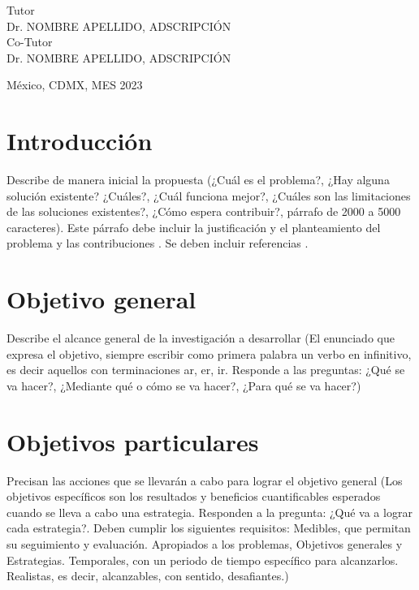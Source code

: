 \documentclass[letterpaper,12pt,oneside]{article}
\begin{document}
\begin{titlepage}
\begin{center}
\begin{center}
				\bigskip
				
				Tutor\\
				Dr. NOMBRE APELLIDO, ADSCRIPCIÓN\\
				
				Co-Tutor \\ %
                Dr. NOMBRE APELLIDO, ADSCRIPCIÓN\\
			\end{center}
			
			\vfill
			
			\begin{center}
				{México, CDMX, MES 2023}\\
			\end{center}
			\cleardoublepage
		\end{center}
	\end{titlepage}
 
\clearpage

\tableofcontents
\clearpage

\section{Introducción} 
Describe de manera inicial la propuesta (¿Cuál es el problema?, ¿Hay alguna solución existente? ¿Cuáles?, ¿Cuál funciona mejor?, ¿Cuáles son las limitaciones de las soluciones existentes?, ¿Cómo espera contribuir?, párrafo de 2000 a 5000 caracteres). Este párrafo debe incluir la justificación y el planteamiento del problema y las contribuciones \cite{phil99}. Se deben incluir referencias \cite{smit54, jame76}.

\section{Objetivo general}
Describe el alcance general de la investigación a desarrollar (El enunciado que expresa el objetivo, siempre escribir como primera palabra un verbo en infinitivo, es decir aquellos con terminaciones ar, er, ir. Responde a las preguntas: ¿Qué se va hacer?, ¿Mediante qué o cómo se va hacer?, ¿Para qué se va hacer?)

\section{Objetivos particulares}
Precisan las acciones que se llevarán a cabo para lograr el objetivo general (Los objetivos específicos son los resultados y beneficios cuantificables esperados cuando se lleva a cabo una estrategia. Responden a la pregunta: ¿Qué va a lograr cada estrategia?. Deben cumplir los siguientes requisitos: Medibles, que permitan su seguimiento y evaluación. Apropiados a los problemas, Objetivos generales y Estrategias. Temporales, con un periodo de tiempo específico para alcanzarlos. Realistas, es decir, alcanzables, con sentido, desafiantes.)
\end{document}
